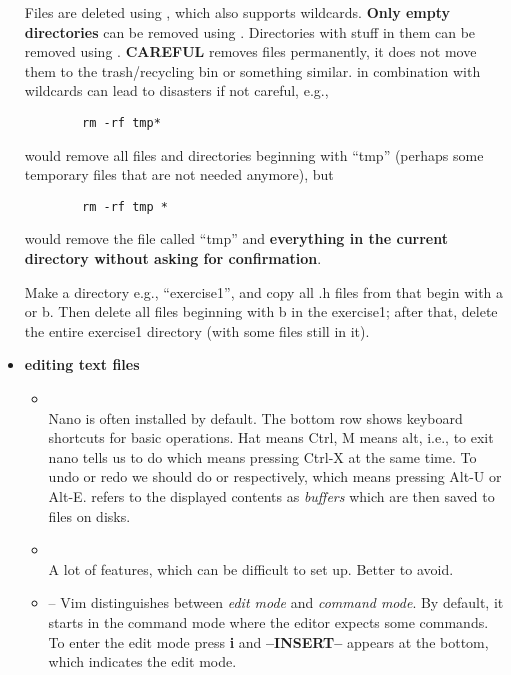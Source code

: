 \begin{itemize}
  Files are deleted using , which also supports wildcards. \textbf{Only empty directories} can be removed using . Directories with stuff in them can be removed using . \textbf{CAREFUL}  removes files permanently, it does not move them to the trash/recycling bin or something similar.  in combination with wildcards can lead to disasters if not careful, e.g.,
    \begin{lstlisting}
        rm -rf tmp*
\end{lstlisting}
  would remove all files and directories beginning with ``tmp'' (perhaps some temporary files that are not needed anymore), but
  \begin{lstlisting}
        rm -rf tmp *
\end{lstlisting}
  would remove the file called ``tmp'' and \textbf{everything in the current directory without asking for confirmation}.

    \begin{exercise}
        Make a directory e.g., ``exercise1'', and copy all .h files from  that begin with a or b. Then delete all files beginning with b in the exercise1; after that, delete the entire exercise1 directory (with some files still in it).
    \end{exercise}
\item
  \textbf{editing text files}

  \begin{itemize}
  \item
    ~\\
    Nano is often installed by default. The bottom row shows keyboard shortcuts for basic operations. Hat \ls{\^} means Ctrl, M means alt, i.e., to exit nano tells us to do  which means pressing Ctrl-X at the same time. To undo or redo we should do  or  respectively, which means pressing Alt-U or Alt-E.  refers to the displayed contents as \emph{buffers} which are then saved to files on disks.
  \item
    ~\\
    A lot of features, which can be difficult to set up. Better to avoid.
  \item
     -- Vim distinguishes between \emph{edit mode} and \emph{command mode}. By default, it starts in the command mode where the editor expects some commands. To enter the edit mode press \textbf{i} and \textbf{--INSERT--} appears at the bottom, which indicates the edit mode.


\end{itemize}
\end{itemize}
